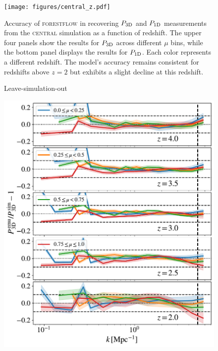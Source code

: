 \documentclass[longauth]{aa}
\newcommand{\poned}{\ensuremath{P_{\rm 1D}}\xspace}
\newcommand{\pthreed}{\ensuremath{P_{\rm 3D}}\xspace}
\newcommand{\forestflow}{\textsc{forestflow}\xspace}
\newcommand{\simcentral}{\textsc{central}\xspace}
\begin{document}
\begin{figure}
\texttt{[image: figures/central\_z.pdf]}
\centering
\caption{Accuracy of \forestflow in recovering \pthreed and \poned measurements from the \simcentral simulation as a function of redshift. The upper four panels show the results for \pthreed across different $\mu$ bins, while the bottom panel displays the results for \poned. Each color represents a different redshift. The model's accuracy remains consistent for redshifts above $z=2$ but exhibits a slight decline at this redshift.
}
\label{fig:central_z}
\end{figure}

\begin{figure}
\centering
\Large{Leave-simulation-out}\par\medskip
\includegraphics[width= 0.95\columnwidth]{figures/l1O_P3D.pdf}

\end{figure}
\end{document}
